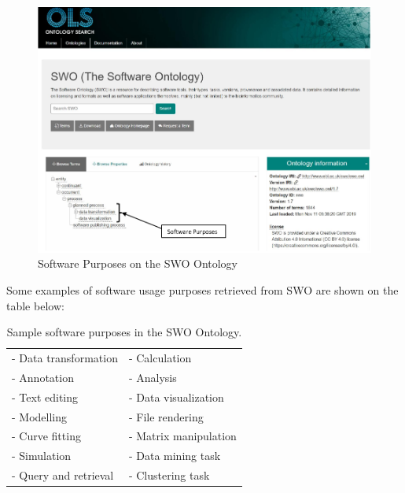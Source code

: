 \begin{figure}[htbp]
	\centering
	\includegraphics[width=1\textwidth]{4.graphics/figures/SWO}
	\caption{Software Purposes on the SWO Ontology}
	\label{fig:chapter03:setup}
\end{figure}

Some examples of software usage purposes retrieved from SWO are shown on the table below:

\begin{table}[h!]
	\begin{center}
		\caption{Sample software purposes in the SWO Ontology.}
		\label{tab:table1}
		\begin{tabular}{|l|l|} %
			
			\hline
			- Data transformation & - Calculation  \\
			- Annotation          & - Analysis \\
			- Text editing        & - Data visualization  \\
			- Modelling           & - File rendering   \\
			- Curve fitting       & - Matrix manipulation  \\
			- Simulation          & - Data mining task   \\
			- Query and retrieval & - Clustering task \\
			
			\hline
		\end{tabular}
	\end{center}
\end{table}


